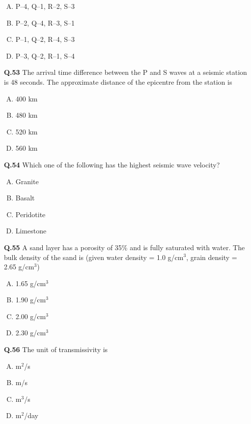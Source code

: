 \begin{enumerate}[(A)]
    \item P--4, Q--1, R--2, S--3
    \item P--2, Q--4, R--3, S--1
    \item P--1, Q--2, R--4, S--3
    \item P--3, Q--2, R--1, S--4
\end{enumerate}

\textbf{Q.53} The arrival time difference between the P and S waves at a seismic station is 48 seconds. The approximate distance of the epicentre from the station is
\begin{enumerate}[(A)]
    \item 400 km
    \item 480 km
    \item 520 km
    \item 560 km
\end{enumerate}

\textbf{Q.54} Which one of the following has the highest seismic wave velocity?
\begin{enumerate}[(A)]
    \item Granite
    \item Basalt
    \item Peridotite
    \item Limestone
\end{enumerate}

\textbf{Q.55} A sand layer has a porosity of 35\% and is fully saturated with water. The bulk density of the sand is (given water density = 1.0 g/cm$^3$, grain density = 2.65 g/cm$^3$)
\begin{enumerate}[(A)]
    \item 1.65 g/cm$^3$
    \item 1.90 g/cm$^3$
    \item 2.00 g/cm$^3$
    \item 2.30 g/cm$^3$
\end{enumerate}

\textbf{Q.56} The unit of transmissivity is
\begin{multicols}{4}
    

\begin{enumerate}[(A)]
    \item m$^2$/s
    \item m/s
    \item m$^3$/s
    \item m$^2$/day
\end{enumerate}
\end{multicols}

